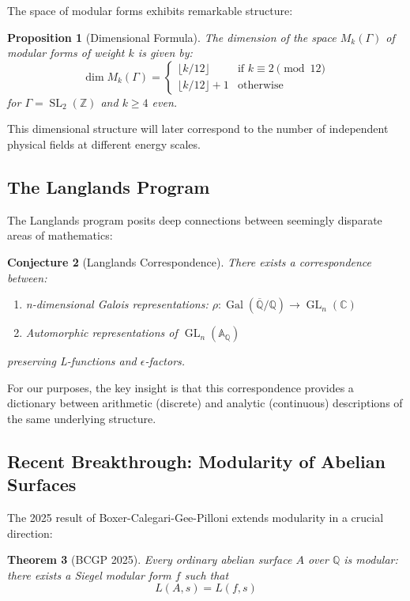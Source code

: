 \documentclass[12pt,a4paper]{article}
\newtheorem{theorem}{Theorem}[section]
\newtheorem{proposition}[theorem]{Proposition}
\newtheorem{conjecture}[theorem]{Conjecture}
\DeclareMathOperator{\GL}{GL}
\DeclareMathOperator{\SL}{SL}
\DeclareMathOperator{\Gal}{Gal}
\begin{document}
The space of modular forms exhibits remarkable structure:

\begin{proposition}[Dimensional Formula]
The dimension of the space $M_k(\Gamma)$ of modular forms of weight $k$ is given by:
\[
\dim M_k(\Gamma) = \begin{cases}
\lfloor k/12 \rfloor & \text{if } k \equiv 2 \pmod{12} \\
\lfloor k/12 \rfloor + 1 & \text{otherwise}
\end{cases}
\]
for $\Gamma = \SL_2(\mathbb{Z})$ and $k \geq 4$ even.
\end{proposition}

This dimensional structure will later correspond to the number of independent physical fields at different energy scales.

\subsection{The Langlands Program}

The Langlands program posits deep connections between seemingly disparate areas of mathematics:

\begin{conjecture}[Langlands Correspondence]
There exists a correspondence between:
\begin{enumerate}
\item n-dimensional Galois representations: $\rho: \Gal(\overline{\mathbb{Q}}/\mathbb{Q}) \to \GL_n(\mathbb{C})$
\item Automorphic representations of $\GL_n(\mathbb{A}_\mathbb{Q})$
\end{enumerate}
preserving L-functions and $\epsilon$-factors.
\end{conjecture}

For our purposes, the key insight is that this correspondence provides a dictionary between arithmetic (discrete) and analytic (continuous) descriptions of the same underlying structure.

\subsection{Recent Breakthrough: Modularity of Abelian Surfaces}

The 2025 result of Boxer-Calegari-Gee-Pilloni extends modularity in a crucial direction:

\begin{theorem}[BCGP 2025]
Every ordinary abelian surface $A$ over $\mathbb{Q}$ is modular: there exists a Siegel modular form $f$ such that
\[
L(A, s) = L(f, s)
\]
\end{theorem}
\end{document}
